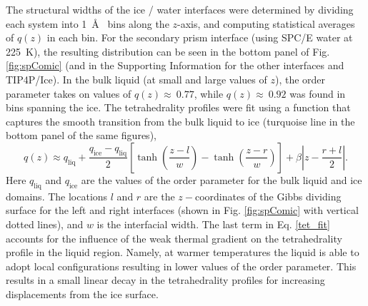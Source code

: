 The structural widths of the ice / water interfaces were determined by
dividing each system into 1~\AA~ bins along the $z$-axis, and
computing statistical averages of $q(z)$ in each bin. For the
secondary prism interface (using SPC/E water at 225~K), the resulting
distribution can be seen in the bottom panel of Fig. \ref{fig:spComic}
(and in the Supporting Information for the other interfaces and
TIP4P/Ice). In the bulk liquid (at small and large values of $z$), the
order parameter takes on values of $q(z) \approx~0.77$, while
$q(z) \approx~0.92$ was found in bins spanning the ice. The
tetrahedrality profiles were fit using a function that captures the
smooth transition from the bulk liquid to ice (turquoise line in the
bottom panel of the same figures),
\begin{equation}\label{tet_fit}
q(z) \approx
q_\mathrm{liq}+\frac{q_\mathrm{ice}-q_\mathrm{liq}}{2}\left[\tanh\left(\frac{z-l}{w}\right)-\tanh\left(\frac{z-r}{w}\right)\right]+\beta\left|z-\frac{r+l}{2}\right|.
\end{equation}
Here $q_\mathrm{liq}$ and $q_\mathrm{ice}$ are the values of the order
parameter for the bulk liquid and ice domains. The locations $l$ and
$r$ are the $z-$coordinates of the Gibbs dividing surface for the left
and right interfaces (shown in Fig. \ref{fig:spComic} with vertical
dotted lines), and $w$ is the interfacial width.  The last term in
Eq. \eqref{tet_fit} accounts for the influence of the weak thermal
gradient on the tetrahedrality profile in the liquid region. Namely,
at warmer temperatures the liquid is able to adopt local
configurations resulting in lower values of the order parameter. This
results in a small linear decay in the tetrahedrality profiles for
increasing displacements from the ice surface.

